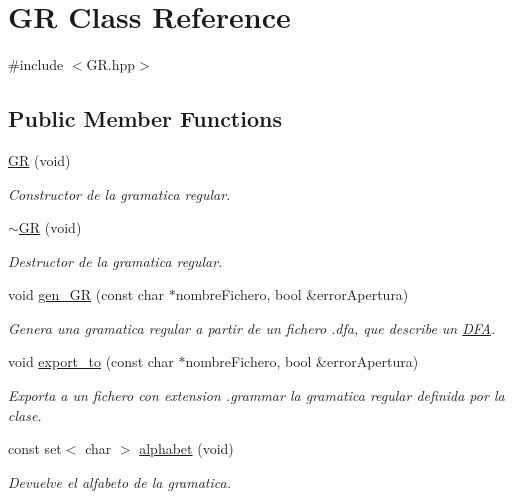 \hypertarget{class_g_r}{}\section{GR Class Reference}
\label{class_g_r}


{\ttfamily \#include $<$G\+R.\+hpp$>$}

\subsection*{Public Member Functions}
\begin{DoxyCompactItemize}
\item 
\hyperlink{class_g_r_a44cfd47b23f3a406312fc79165459e9d}{GR} (void)
\begin{DoxyCompactList}\small\item\em Constructor de la gramatica regular. \end{DoxyCompactList}\item 
\hyperlink{class_g_r_a60a1df45425dce1a14e0ad5b8677b8fa}{$\sim$\+GR} (void)
\begin{DoxyCompactList}\small\item\em Destructor de la gramatica regular. \end{DoxyCompactList}\item 
void \hyperlink{class_g_r_aa621faa9150e57848b3b2b11a52c4fa5}{gen\+\_\+\+GR} (const char $\ast$nombre\+Fichero, bool \&error\+Apertura)
\begin{DoxyCompactList}\small\item\em Genera una gramatica regular a partir de un fichero .dfa, que describe un \hyperlink{class_d_f_a}{D\+FA}. \end{DoxyCompactList}\item 
void \hyperlink{class_g_r_a5c4dca6e2174446585a234b4e8792743}{export\+\_\+to} (const char $\ast$nombre\+Fichero, bool \&error\+Apertura)
\begin{DoxyCompactList}\small\item\em Exporta a un fichero con extension \textquotesingle{}.grammar\textquotesingle{} la gramatica regular definida por la clase. \end{DoxyCompactList}\item 
const set$<$ char $>$ \hyperlink{class_g_r_a316145725ac4ad4acbf7fe9a3f4740bb}{alphabet} (void)
\begin{DoxyCompactList}\small\item\em Devuelve el alfabeto de la gramatica. \end{DoxyCompactList}\end{DoxyCompactItemize}


